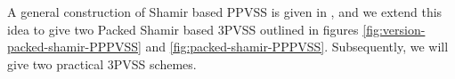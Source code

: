A general construction of Shamir based PPVSS is given in \cite{cryptoeprint:2025/576}, and we extend this idea 
to give two Packed Shamir based 3PVSS outlined in figures \ref{fig:version-packed-shamir-PPPVSS} and \ref{fig:packed-shamir-PPPVSS}. 
Subsequently, we will give two practical 3PVSS schemes. 




% 




